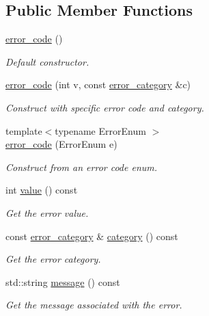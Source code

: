 \subsection*{Public Member Functions}
\begin{DoxyCompactItemize}
\item 
\hyperlink{classasio_1_1error__code_a25868f79c0878e08201b5455b602a3cd}{error\+\_\+code} ()
\begin{DoxyCompactList}\small\item\em Default constructor. \end{DoxyCompactList}\item 
\hyperlink{classasio_1_1error__code_adcaa65f1e16f531f8c7d7a58e4877205}{error\+\_\+code} (int v, const \hyperlink{classasio_1_1error__category}{error\+\_\+category} \&c)
\begin{DoxyCompactList}\small\item\em Construct with specific error code and category. \end{DoxyCompactList}\item 
{\footnotesize template$<$typename Error\+Enum $>$ }\\\hyperlink{classasio_1_1error__code_a3e5c3cc1df43f8ba627615d33b2633ff}{error\+\_\+code} (Error\+Enum e)
\begin{DoxyCompactList}\small\item\em Construct from an error code enum. \end{DoxyCompactList}\item 
int \hyperlink{classasio_1_1error__code_ab6572bd45becb7e0e337034fdd058723}{value} () const 
\begin{DoxyCompactList}\small\item\em Get the error value. \end{DoxyCompactList}\item 
const \hyperlink{classasio_1_1error__category}{error\+\_\+category} \& \hyperlink{classasio_1_1error__code_ab8a753de4f553710aac45125f11fead3}{category} () const 
\begin{DoxyCompactList}\small\item\em Get the error category. \end{DoxyCompactList}\item 
std\+::string \hyperlink{classasio_1_1error__code_a9e15b346b9ec23275530835d9c150711}{message} () const 
\begin{DoxyCompactList}\small\item\em Get the message associated with the error. \end{DoxyCompactList}\item 

\end{DoxyCompactItemize}
